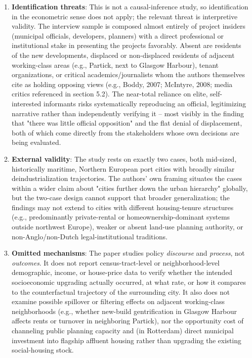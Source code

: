 \begin{enumerate}
  \item \textbf{Identification threats}: This is not a causal-inference study, so identification in the econometric sense does not apply; the relevant threat is interpretive validity. The interview sample is composed almost entirely of project insiders (municipal officials, developers, planners) with a direct professional or institutional stake in presenting the projects favorably. Absent are residents of the new developments, displaced or non-displaced residents of adjacent working-class areas (e.g., Partick, next to Glasgow Harbour), tenant organizations, or critical academics/journalists whom the authors themselves cite as holding opposing views (e.g., Boddy, 2007; McIntyre, 2008; media critics referenced in section 5.2). The near-total reliance on elite, self-interested informants risks systematically reproducing an official, legitimizing narrative rather than independently verifying it -- most visibly in the finding that "there was little official opposition" and the flat denial of displacement, both of which come directly from the stakeholders whose own decisions are being evaluated.
  \item \textbf{External validity}: The study rests on exactly two cases, both mid-sized, historically maritime, Northern European port cities with broadly similar deindustrialization trajectories. The authors' own framing situates the cases within a wider claim about "cities further down the urban hierarchy" globally, but the two-case design cannot support that broader generalization; the findings may not extend to cities with different housing-tenure structures (e.g., predominantly private-rental or homeownership-dominant systems outside northwest Europe), weaker or absent land-use planning authority, or non-Anglo/non-Dutch legal-institutional traditions.
  \item \textbf{Omitted mechanisms}: The paper studies policy \emph{discourse} and \emph{process}, not \emph{outcomes}. It does not report census-tract-level or neighborhood-level demographic, income, or house-price data to verify whether the intended socioeconomic upgrading actually occurred, at what rate, or how it compares to the counterfactual trajectory of the surrounding city. It also does not examine possible spillover or filtering effects on adjacent working-class neighborhoods (e.g., whether new-build gentrification in Glasgow Harbour affects rents or turnover in neighboring Partick), nor the opportunity cost of channeling public planning capacity and (in Rotterdam) direct municipal investment into flagship affluent housing rather than upgrading the existing social-housing stock.

\end{enumerate}
